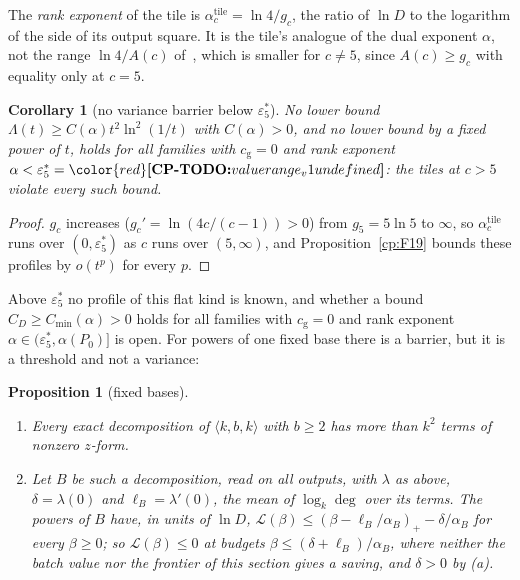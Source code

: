 \documentclass[11pt]{article}
\makeatletter
\newtheorem{corollary}[theorem]{Corollary}
\newtheorem{proposition}[theorem]{Proposition}
\theoremstyle{definition}
\theoremstyle{remark}
\DeclareRobustCommand{\CPTODO}[1]{{\color{red}\textbf{[CP-TODO:} #1\textbf{]}}}
\newcommand{\mat}[3]{\langle #1,#2,#3\rangle} %
\newcommand{\es}{\varepsilon^*_5}             %
\newcommand{\alB}{\alpha_B}                   %
\newcommand{\cg}{c_{\mathrm g}}               %
\newcommand{\Pzero}{P_0}                      %
\newcommand{\Leg}{\mathcal{L}}                        %
\newcommand{\cpv}[1]{\ifcsname cpv@#1\endcsname\csname cpv@#1\endcsname\else\CPTODO{value #1 undefined}\fi}
\makeatother
\begin{document}
The \emph{rank exponent} of the tile is $\alpha^{\mathrm{tile}}_c=\ln4/g_c$, the ratio of $\ln D$ to the logarithm of the side of its output square. It is the tile's analogue of the dual exponent $\alpha$, not the range $\ln4/A(c)$ of~\cite{v2}, which is smaller for $c\ne5$, since $A(c)\ge g_c$ with equality only at $c=5$.

\begin{corollary}[no variance barrier below $\es$]\label{cp:F20}
No lower bound $\Lambda(t)\ge C(\alpha)t^2\ln^2(1/t)$ with $C(\alpha)>0$, and no lower bound by a fixed power of $t$, holds for all families with $\cg=0$ and rank exponent $\alpha<\es=\cpv{range_v1}$: the tiles at $c>5$ violate every such bound.
\end{corollary}

\begin{proof}
$g_c$ increases ($g_c'=\ln(4c/(c-1))>0$) from $g_5=5\ln5$ to $\infty$, so $\alpha^{\mathrm{tile}}_c$ runs over $(0,\es)$ as $c$ runs over $(5,\infty)$, and Proposition~\ref{cp:F19} bounds these profiles by $o(t^p)$ for every $p$.
\end{proof}

Above $\es$ no profile of this flat kind is known, and whether a bound $C_D\ge C_{\min}(\alpha)>0$ holds for all families with $\cg=0$ and rank exponent $\alpha\in(\es,\alpha(\Pzero)]$ is open. For powers of one fixed base there is a barrier, but it is a threshold and not a variance:

\begin{proposition}[fixed bases]\label{cp:F21}
\begin{enumerate}[label=(\alph*)]
\item Every exact decomposition of $\mat kbk$ with $b\ge2$ has more than $k^2$ terms of nonzero $z$-form.
\item Let $B$ be such a decomposition, read on all outputs, with $\lambda$ as above, $\delta=\lambda(0)$ and $\ell_B=\lambda'(0)$, the mean of $\log_k\deg$ over its terms. The powers of $B$ have, in units of $\ln D$, $\Leg(\beta)\le(\beta-\ell_B/\alB)_+-\delta/\alB$ for every $\beta\ge0$; so $\Leg(\beta)\le0$ at budgets $\beta\le(\delta+\ell_B)/\alB$, where neither the batch value nor the frontier of this section gives a saving, and $\delta>0$ by (a).
\end{enumerate}
\end{proposition}
\end{document}

